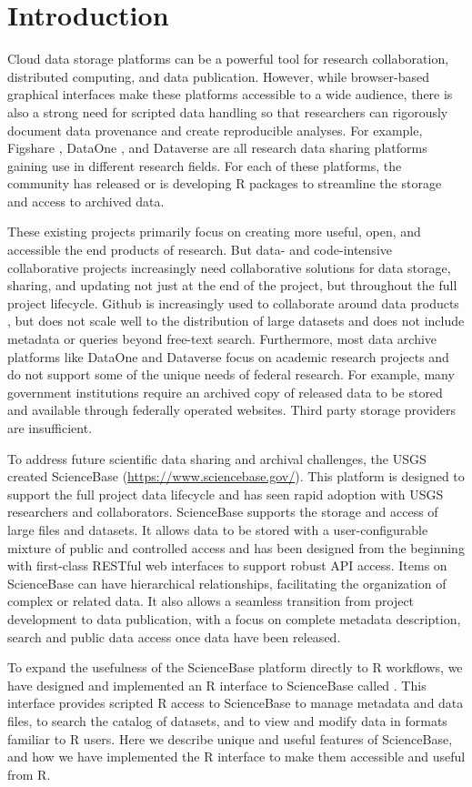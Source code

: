 \section{Introduction}

Cloud data storage platforms can be a powerful tool for research collaboration,
distributed computing, and data publication. However, while browser-based graphical
interfaces make these platforms accessible to a wide audience, there is also
a strong need for scripted data handling so that researchers can rigorously
document data provenance and create reproducible analyses. For example,
Figshare , DataOne , and Dataverse  
are all research data
sharing platforms gaining use in different research fields. For each of these
platforms, the community has released \citep{rfigshare, dvn} or is
developing \citep{dataone} R packages to streamline the storage and access
to archived data. 

These existing projects primarily focus on creating more useful, open, and
accessible the end products of research. But data- and code-intensive collaborative projects
increasingly need collaborative solutions for data storage, sharing, and updating
not just at the end of the project, but throughout the full project lifecycle. 
Github is increasingly used to collaborate around data products \citep{GandrudGithub}, 
but does not scale well to the distribution of large datasets \citep{Delcambre2013} and does not
include metadata or queries beyond free-text search. Furthermore, 
most data archive platforms like DataOne and Dataverse 
focus on academic research projects and do not support some
of the unique needs of federal research. For example, many government institutions
require an archived copy of released data to be stored and available through federally
operated websites. Third party storage providers are insufficient.

To address future scientific data sharing and archival challenges, the USGS
created ScienceBase (\url{https://www.sciencebase.gov/}). This platform is
designed to support
the full project data lifecycle and has seen rapid adoption with USGS
researchers and collaborators. ScienceBase supports the storage and access
of large files and datasets. It allows data to be stored with a user-configurable 
mixture of
public and controlled access and has been designed from the beginning with
first-class RESTful web interfaces to support robust API access. Items on ScienceBase 
can have hierarchical relationships, facilitating the organization of complex or related
data. It also allows
a seamless transition from project development to data publication, with
a focus on complete metadata description, search and public data access once 
data have been released.

To expand the usefulness of the ScienceBase platform directly to R workflows, 
we have designed and
implemented an R interface to ScienceBase called .
This interface provides scripted R access to ScienceBase to manage metadata and
data files, to search the catalog of datasets, and to view and modify data in
formats familiar to R users.
Here we describe unique and useful features of ScienceBase, and how we have
implemented the R interface to make them accessible and useful from R.
